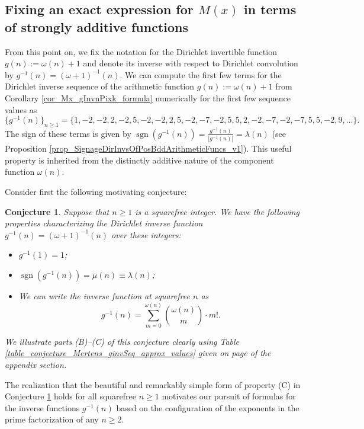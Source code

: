 \documentclass[11pt,reqno,a4letter]{article}
\numberwithin{figure}{section}
\numberwithin{table}{section}
\theoremstyle{plain}
\newtheorem{conjecture}[theorem]{Conjecture}
\numberwithin{theorem}{section}
\theoremstyle{definition}
\newcommand{\NBRef}[1]{}
\begin{document}
\subsection{Fixing an exact expression for $M(x)$ in terms of strongly additive functions} 
\label{example_InvertingARecRelForMx_Intro}

From this point on, we fix the notation for the Dirichlet invertible function $g(n) := \omega(n) + 1$ and denote its 
inverse with respect to Dirichlet convolution by $g^{-1}(n) = (\omega+1)^{-1}(n)$. 
We can compute the first few terms for the
Dirichlet inverse sequence of the arithmetic function 
$g(n) := \omega(n) + 1$ from 
Corollary \ref{cor_Mx_gInvnPixk_formula} 
numerically for the first few sequence values as 
\[
\{g^{-1}(n)\}_{n \geq 1} = \{1, -2, -2, 2, -2, 5, -2, -2, 2, 5, -2, -7, -2, 5, 5, 2, -2, -7, -2, 
     -7, 5, 5, -2, 9, \ldots \}. 
\] 
The sign of these terms is given by $\operatorname{sgn}(g^{-1}(n)) = \frac{g^{-1}(n)}{|g^{-1}(n)|} = \lambda(n)$ 
(see Proposition \ref{prop_SignageDirInvsOfPosBddArithmeticFuncs_v1}). 
This useful property is inherited from the distinctly 
additive nature of the component function $\omega(n)$. 

Consider first the following motivating conjecture: 
\NBRef{A01-2020-04-26}

\begin{conjecture}
\label{lemma_gInv_MxExample} 
Suppose that $n \geq 1$ is a squarefree integer. We have the following properties characterizing the 
Dirichlet inverse function $g^{-1}(n) = (\omega+1)^{-1}(n)$ over these integers: 
\begin{itemize} 

\item[(A)] $g^{-1}(1) = 1$; 
\item[(B)] $\operatorname{sgn}(g^{-1}(n)) = \mu(n) \equiv \lambda(n)$; 
\item[(C)] We can write the inverse function at squarefree $n$ as 
     \[
     g^{-1}(n) = \sum_{m=0}^{\omega(n)} \binom{\omega(n)}{m} \cdot m!. 
     \]
\end{itemize} 
We illustrate parts (B)--(C) of this conjecture clearly using 
Table \ref{table_conjecture_Mertens_ginvSeq_approx_values} given on 
page \pageref{table_conjecture_Mertens_ginvSeq_approx_values} of the appendix section. 
\end{conjecture} 

The realization that the beautiful and remarkably simple form of property (C) 
in Conjecture \ref{lemma_gInv_MxExample} holds for all squarefree $n \geq 1$ 
motivates our pursuit of formulas for the inverse functions $g^{-1}(n)$ based on the configuration of the 
exponents in the prime factorization of any $n \geq 2$. 
\end{document}
